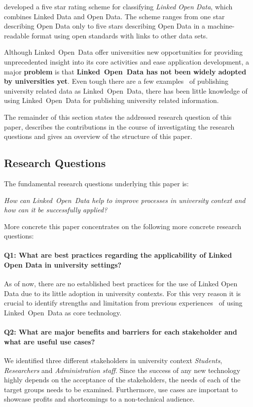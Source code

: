 \documentclass{article}
\begin{document}
\citet{artivle:bernerslee-t-2006-1} developed a five star rating scheme for classifying \textit{Linked Open Data}, which combines Linked Data and Open Data. The scheme ranges from one star describing Open Data only to five stars describing Open Data in a machine-readable format using open standards with links to other data sets.

Although Linked~Open~Data offer universities new opportunities for providing unprecedented insight into its core activities and ease application development, a major \textbf{problem} is that \textbf{Linked~Open~Data has not been widely adopted by universities yet}. Even tough there are a few examples~\cite{url:linked-universities-members} of publishing university related data as Linked~Open~Data, there has been little knowledge of using Linked~Open~Data for publishing university related information. 

The remainder of this section states the addressed research question of this paper, describes the contributions in the course of investigating the research questions and gives an overview of the structure of this paper.

\subsection{Research Questions}
The fundamental research questions underlying this paper is:
\begin{displayquote}
\textit{How can Linked~Open~Data help to improve processes in university context and how can it be successfully applied?}
\end{displayquote}
More concrete this paper concentrates on the following more concrete research questions:
\paragraph{Q1: What are best practices regarding the applicability of Linked Open Data in university settings?}
As of now, there are no established best practices for the use of Linked Open Data due to its little adoption in university contexts. For this very reason it is crucial to identify strengths and limitation from previous experiences~\cite{url:linked-universities-members} of using Linked~Open~Data as core technology. 
\paragraph{Q2: What are major benefits and barriers for each stakeholder and what are useful use cases?}
We identified three different stakeholders in university context \textit{Students}, \textit{Researchers} and \textit{Administration staff}. Since the success of any new technology highly depends on the acceptance of the stakeholders, the needs of each of the target groups needs to be examined. Furthermore, use cases are important to showcase profits and shortcomings to a non-technical audience. 
\end{document}
